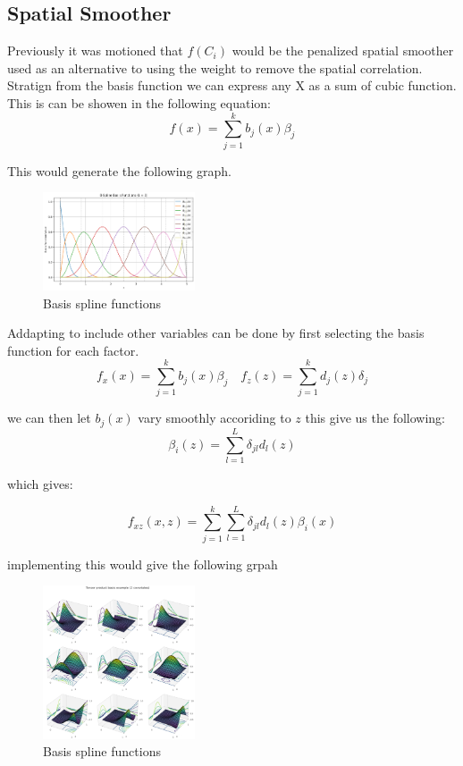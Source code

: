 \documentclass{article}
\begin{document}
\subsection{Spatial Smoother}

Previously it was motioned that $f(C_i)$ would be the penalized spatial smoother used as an alternative to using the weight to remove the spatial correlation. Stratign from the basis
function we can express any X as a sum of cubic function. This is can be showen in the following equation:
\begin{equation}
	f(x) = \sum^{k}_{j=1}b_j(x) \beta_j
\end{equation}

This would generate the following graph.
\begin{figure}[H]
	\centering
	\includegraphics[width=0.4\textwidth]{assets/b-splines.png}
	\caption{Basis spline functions}
\end{figure}

Addapting to include other variables can be done by first selecting the basis function for each factor.
$$
	f_x(x) = \sum^{k}_{j=1}b_j(x) \beta_j \quad f_z(z) = \sum^{k}_{j=1}d_j(z) \delta_j
$$

we can then let $b_j(x)$ vary smoothly accoriding to $z$ this give us the following:
$$
	\beta_i(z) = \sum_{l=1}^{L} \delta_{jl}d_l(z)
$$

which gives:

\begin{equation}
	f_{xz}(x,z)= \sum^{k}_{j=1}\sum_{l=1}^{L} \delta_{jl}d_l(z) \beta_i(x)
\end{equation}


implementing this would give the following grpah
\begin{figure}[H]
	\centering
	\includegraphics[width=0.4\textwidth]{assets/tensor.png}
	\caption{Basis spline functions}
\end{figure}
\end{document}
